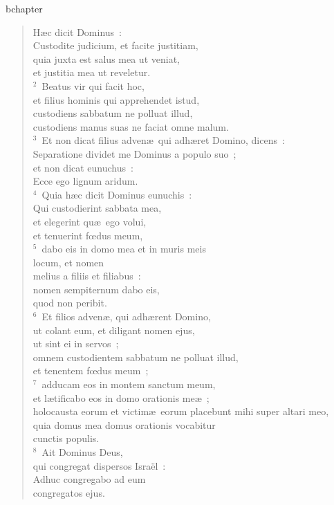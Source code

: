 bchapter\begin{verse}\vspace{-19pt}H\ae c dicit Dominus~:\\ Custodite judicium, et facite justitiam,\\ quia juxta est salus mea ut veniat,\\ et justitia mea ut reveletur.\\
${}^{2}$~Beatus vir qui facit hoc,\\ et filius hominis qui apprehendet istud,\\ custodiens sabbatum ne polluat illud,\\ custodiens manus suas ne faciat omne malum.\\
${}^{3}$~Et non dicat filius adven\ae\ qui adh\ae ret Domino, dicens~:\\ Separatione dividet me Dominus a populo suo~;\\ et non dicat eunuchus~:\\ Ecce ego lignum aridum.\\
${}^{4}$~Quia h\ae c dicit Dominus eunuchis~:\\ Qui custodierint sabbata mea,\\ et elegerint qu\ae\ ego volui,\\ et tenuerint fœdus meum,\\
${}^{5}$~dabo eis in domo mea et in muris meis\\ locum, et nomen\\ melius a filiis et filiabus~:\\ nomen sempiternum dabo eis,\\ quod non peribit.\\
${}^{6}$~Et filios adven\ae , qui adh\ae rent Domino,\\ ut colant eum, et diligant nomen ejus,\\ ut sint ei in servos~;\\ omnem custodientem sabbatum ne polluat illud,\\ et tenentem fœdus meum~;\\
${}^{7}$~adducam eos in montem sanctum meum,\\ et l\ae tificabo eos in domo orationis me\ae~;\\ holocausta eorum et victim\ae\ eorum placebunt mihi super altari meo,\\ quia domus mea domus orationis vocabitur\\ cunctis populis.\\
${}^{8}$~Ait Dominus Deus,\\ qui congregat dispersos Isra\"el~:\\ Adhuc congregabo ad eum\\ congregatos ejus.\end{verse}


